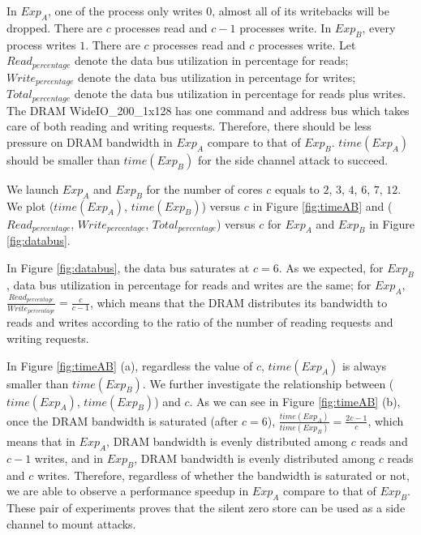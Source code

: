 \documentclass{iacrtrans}
\begin{document}
In $Exp_A$, one of the process only writes $0$, almost all of its writebacks will be dropped. There are $c$ processes read and $c-1$ processes write. In $Exp_B$, every process writes $1$. There are $c$ processes read and $c$ processes write. Let $Read_{percentage}$ denote the data bus utilization in percentage for reads; $Write_{percentage}$ denote the data bus utilization in percentage for writes; $Total_{percentage}$ denote the data bus utilization in percentage for reads plus writes. The DRAM WideIO\_200\_1x128 has one command and address bus which takes care of both reading and writing requests. Therefore, there should be less pressure on DRAM bandwidth in $Exp_A$ compare to that of $Exp_B$. $time(Exp_A)$ should be smaller than $time(Exp_B)$ for the side channel attack to succeed. 

We launch $Exp_A$ and $Exp_B$ for the number of cores $c$ equals to $2$, $3$, $4$, $6$, $7$, $12$. We plot ($time(Exp_A)$, $time(Exp_B)$) versus $c$ in Figure \ref{fig:timeAB} and ($Read_{percentage}$, $Write_{percentage}$, $Total_{percentage}$) versus $c$ for $Exp_A$ and $Exp_B$ in Figure \ref{fig:databus}.

In Figure \ref{fig:databus}, the data bus saturates at $c=6$. As we expected, for $Exp_B$, data bus utilization in percentage for reads and writes are the same; for $Exp_A$, $\frac{Read_{percentage}}{Write_{percentage}} = \frac{c}{c-1}$, which means that the DRAM distributes its bandwidth to reads and writes according to the ratio of the number of reading requests and writing requests.  

In Figure \ref{fig:timeAB} (a), regardless the value of $c$, $time(Exp_A)$ is always smaller than $time(Exp_B)$. We further investigate the relationship between ($time(Exp_A)$, $time(Exp_B)$) and $c$. As we can see in Figure \ref{fig:timeAB} (b), once the DRAM bandwidth is saturated (after $c=6$), $\frac{time(Exp_A)}{time(Exp_B)} = \frac{2c-1}{c}$, which means that in $Exp_A$, DRAM bandwidth is evenly distributed among $c$ reads and $c-1$ writes, and in $Exp_B$, DRAM bandwidth is evenly distributed among $c$ reads and $c$ writes. Therefore, regardless of whether the bandwidth is saturated or not, we are able to observe a performance speedup in $Exp_A$ compare to that of $Exp_B$. These pair of experiments proves that the silent zero store can be used as a side channel to mount attacks.
\end{document}
